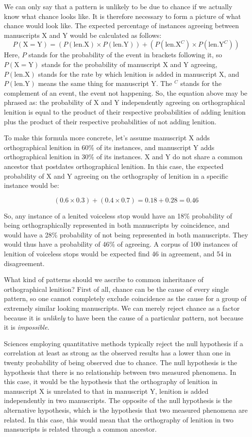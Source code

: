 We can only say that a pattern is unlikely to be due to chance if we actually know what chance looks like. It is therefore necessary to form a picture of what chance would look like. The expected percentage of instances agreeing between manuscripts X and Y would be calculated as follows:
\[P(\text{X} = \text{Y}) = (P(\text{len.X}) \times P(\text{len.Y})) + (P(\text{len.X}^C) \times P(\text{len.Y}^C))\]
Here, \(P\) stands for the probability of the event in brackets following it, so \(P(\text{X}=\text{Y})\) stands for the probability of manuscript X and Y agreeing, \(P(\text{len.X})\) stands for the rate by which lenition is added in manuscript X, and \(P(\text{len.Y})\) means the same thing for manuscript Y. The \(^C\) stands for the complement of an event, \ie the event not happening. So, the equation above may be phrased as: the probability of X and Y independently agreeing on orthographical lenition is equal to the product of their respective probabilities of adding lenition plus the product of their respective probabilities of not adding lenition.

To make this formula more concrete, let's assume manuscript X adds orthographical lenition in 60\% of its instances, and manuscript Y adds orthographical lenition in 30\% of its instances. X and Y do not share a common ancestor that postdates orthographical lenition. In this case, the expected probability of X and Y agreeing on the orthography of lenition in a specific instance would be:

\[(0.6 \times 0.3) + (0.4 \times 0.7) = 0.18 + 0.28 = 0.46\]

So, any instance of a lenited voiceless stop would have an 18\% probability of being orthographically represented in both manuscripts by coincidence, and would have a 28\% probability of not being represented in both manuscripts. They would thus have a probability of 46\% of agreeing. A corpus of 100 instances of lenition of voiceless stops would be expected find 46 in agreement, and 54 in disagreement.

What kind of patterns should we ascribe to common inheritance of orthographical lenition? First of all, chance can be the cause of every single pattern, so one cannot completely exclude coincidence as the cause for a group of extremely similar looking manuscripts. We can merely reject chance as a factor because it is \emph{unlikely} to have been the cause of a particular pattern, not because it is \emph{impossible}.

Sciences employing quantitative methods typically reject the null hypothesis if a correlation at least as strong as the observed results has a lower than one in twenty probability of being observed due to chance.  The null hypothesis is the hypothesis that there is no relationship between two measured phenomena. In this case, it would be the hypothesis that the orthography of lenition in manuscript X is unrelated to that in manuscript Y, \ie lenition is added independently in two manuscripts. The opposite of the null hypothesis is the alternative hypothesis, which is the hypothesis that two measured phenomena are related. In this case, this would mean that the orthography of lenition in two mansucripts is related through a common ancestor.

